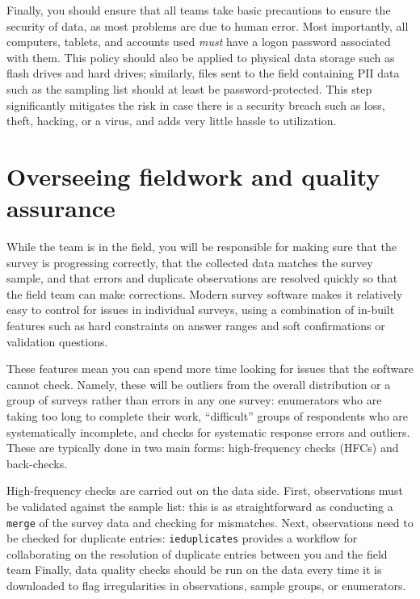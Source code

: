 Finally, you should ensure that all teams take basic precautions
to ensure the security of data, as most problems are due to human error.
Most importantly, all computers, tablets, and accounts used
\textit{must} have a logon password associated with them.
This policy should also be applied to physical data storage
such as flash drives and hard drives;
similarly, files sent to the field containing PII data
such as the sampling list should at least be password-protected.
This step significantly mitigates the risk in case there is
a security breach such as loss, theft, hacking, or a virus,
and adds very little hassle to utilization.



\section{Overseeing fieldwork and quality assurance}

While the team is in the field, you will be responsible
for making sure that the survey is progressing correctly,
that the collected data matches the survey sample,
and that errors and duplicate observations are resolved
quickly so that the field team can make corrections.
Modern survey software makes it relatively easy
to control for issues in individual surveys,
using a combination of in-built features
such as hard constraints on answer ranges
and soft confirmations or validation questions.

These features mean you can spend more time
looking for issues that the software cannot check.
Namely, these will be outliers from the overall distribution
or a group of surveys rather than errors in any one survey:
enumerators who are taking too long to complete their work,
``difficult'' groups of respondents who are systematically incomplete,
and checks for systematic response errors and outliers.
These are typically done in two main forms:
high-frequency checks (HFCs) and back-checks.

High-frequency checks are carried out on the data
side.
First, observations must be validated against the sample list:
this is as straightforward as conducting a \texttt{merge}
of the survey data and checking for mismatches.
Next, observations need to be checked for duplicate entries:
\texttt{ieduplicates}
provides a workflow for collaborating on the resolution of
duplicate entries between you and the field team
Finally, data quality checks
should be run on the data every time it is downloaded
to flag irregularities in observations, sample groups, or enumerators.

